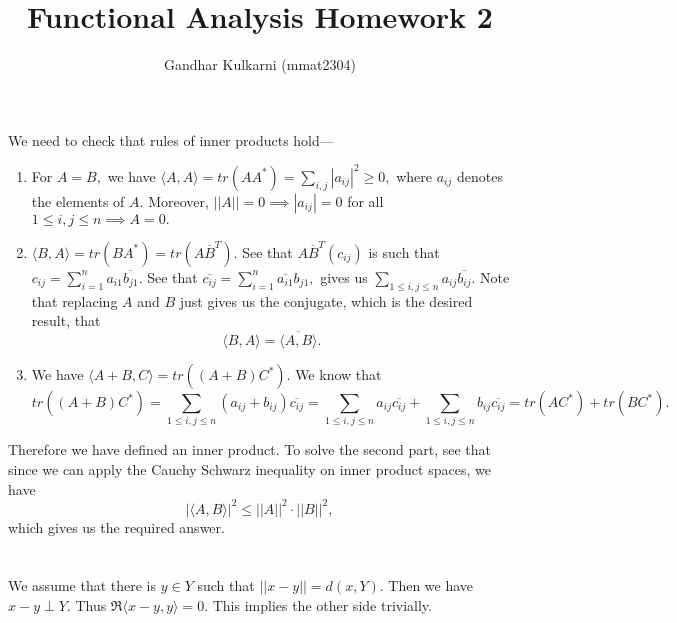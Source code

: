 \documentclass{article}
\title{Functional Analysis Homework 2} %
\author{Gandhar Kulkarni (mmat2304)} %
\date{} %
\begin{document}
\maketitle %


\section{} %
We need to check that rules of inner products hold--- 
\begin{enumerate}
	\item For $A=B,$ we have $\langle A,A\rangle=tr(AA^*)= \sum_{i,j}|a_{ij}|^2 \geq 0,$ where $a_{ij}$ denotes the elements of $A.$ 
	Moreover, $||A|| =0 \implies |a_{ij}| =0 $ for all $1 \leq i,j \leq n \implies A=0.$ 
	\item $\langle B,A \rangle = tr(BA^*)= tr(A\overline{B}^T).$ See that $A\overline{B}^T (c_{ij})$ is such that 
	$c_{ij}= \sum_{i=1}^n a_{i1}\overline{b_{j1}}.$ See that $\overline{c_{ij}}=\sum_{i=1}^n \overline{a_{i1} } b_{j1},$ gives us $ \sum_{1 \leq i,j \leq n} 
	a_{ij}\overline{b_{ij}}.$ Note that replacing $A$ and $B$ just gives us the conjugate, which is the desired result, that $$\langle B,A \rangle = 
	\overline{\langle A,B  \rangle}. $$
	\item We have $\langle A+B,C\rangle= tr((A+B)C^*).$ We know that $$tr((A+B)C^*)= \sum_{1 \leq i,j \leq n} (a_{ij}+b_{ij}) \overline{c_{ij}}=\sum_{1 \leq 
	i,j \leq n} a_{ij}\overline{c_{ij}} +\sum_{1 \leq i,j \leq n} b_{ij} \overline{c_{ij}}= tr(AC^*) + tr(BC^*).$$ 
\end{enumerate}
Therefore we have defined an inner product. 
To solve the second part, see that since we can apply the Cauchy Schwarz inequality on inner product spaces, we have $$|\langle A,B\rangle|^2 \leq ||A||^2 
\cdot ||B||^2,$$ which gives us the required answer.
\section{} %
\section{} %
We assume that there is $y \in Y$ such that $||x-y|| = d(x,Y).$ Then we have $x-y \perp Y.$ Thus $\Re \langle x-y,y \rangle =0.$ This implies the other side 
trivially. 
\end{document}
